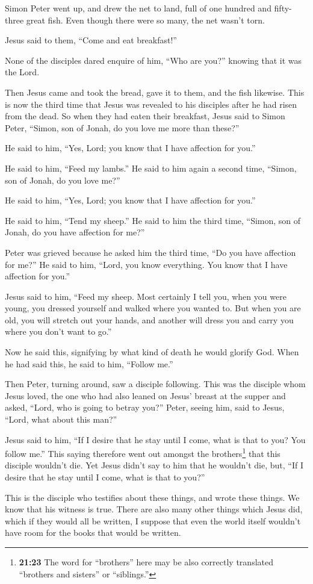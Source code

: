  Simon Peter went up, and drew the net to land, full of
one hundred and fifty-three great fish. Even though there were so many,
the net wasn't torn.

 Jesus said to them, ``Come and eat breakfast!''

None of the disciples dared enquire of him, ``Who are you?'' knowing
that it was the Lord.

 Then Jesus came and took the bread, gave it to them, and
the fish likewise.  This is now the third time that Jesus
was revealed to his disciples after he had risen from the dead.
 So when they had eaten their breakfast, Jesus said to
Simon Peter, ``Simon, son of Jonah, do you love me more than these?''

He said to him, ``Yes, Lord; you know that I have affection for you.''

He said to him, ``Feed my lambs.''  He said to him again
a second time, ``Simon, son of Jonah, do you love me?''

He said to him, ``Yes, Lord; you know that I have affection for you.''

He said to him, ``Tend my sheep.''  He said to him the
third time, ``Simon, son of Jonah, do you have affection for me?''

Peter was grieved because he asked him the third time, ``Do you have
affection for me?'' He said to him, ``Lord, you know everything. You
know that I have affection for you.''

Jesus said to him, ``Feed my sheep.  Most certainly I
tell you, when you were young, you dressed yourself and walked where you
wanted to. But when you are old, you will stretch out your hands, and
another will dress you and carry you where you don't want to go.''

 Now he said this, signifying by what kind of death he
would glorify God. When he had said this, he said to him, ``Follow me.''

 Then Peter, turning around, saw a disciple following.
This was the disciple whom Jesus loved, the one who had also leaned on
Jesus' breast at the supper and asked, ``Lord, who is going to betray
you?''  Peter, seeing him, said to Jesus, ``Lord, what
about this man?''

 Jesus said to him, ``If I desire that he stay until I
come, what is that to you? You follow me.''  This saying
therefore went out amongst the brothers\footnote{\textbf{21:23} The word
  for ``brothers'' here may be also correctly translated ``brothers and
  sisters'' or ``siblings.''} that this disciple wouldn't die. Yet Jesus
didn't say to him that he wouldn't die, but, ``If I desire that he stay
until I come, what is that to you?''

 This is the disciple who testifies about these things,
and wrote these things. We know that his witness is true.
 There are also many other things which Jesus did, which
if they would all be written, I suppose that even the world itself
wouldn't have room for the books that would be written.
